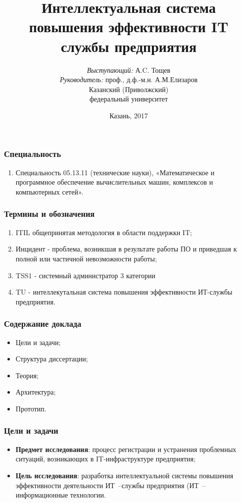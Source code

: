 \documentclass[14pt]{beamer}
\title{\small{Интеллектуальная система повышения эффективности IT службы предприятия}}
\author{\small{%
\emph{Выступающий:} А.C. Тощев\\%
\emph{Руководитель:} проф., д.ф.-м.н. А.М.Елизаров}\\%
\vspace{30pt}%
Казанский (Приволжский)\\
федеральный университет%
\vspace{20pt}%
}
\date{\small{Казань, 2017}}
\begin{document}
\maketitle

\begin{frame}
\frametitle{Специальность}
\begin{enumerate}
    \item Специальность 05.13.11 (технические науки), «Математическое и программное обеспечение вычислительных машин, комплексов и компьютерных сетей».
\end{enumerate}
\end{frame}


\begin{frame}
\frametitle{Термины и обозначения}
\begin{enumerate}
    \item ITIL общепринятая методология в области поддержки IT;
    \item Инцидент - проблема, возникшая в результате работы ПО и приведшая к полной или частичной невозможности работы;
    \item TSS1 - системный администратор 3 категории
    \item TU - интеллекутальная система повышения эффективности ИТ-службы предприятия.
  
\end{enumerate}
\end{frame}

\begin{frame}
\frametitle{Содержание доклада}
\begin{itemize}
  \item Цели и задачи; 
  \item Структура диссертации;
  \item Теория;
  \item Архитектура;
  \item Прототип.
\end{itemize}\end{frame}

\begin{frame}
\frametitle{Цели и задачи}
\begin{itemize}
    \item \textbf{Предмет исследования}: процесс регистрации и устранения проблемных ситуаций, возникающих в IT-инфраструктуре предприятия;
    \item \textbf{Цель исследования}: разработка интеллектуальной системы повышения эффективности деятельности ИТ~--службы предприятия (ИТ~-- информационные технологии.
\end{itemize}
\end{frame}
\end{document}
